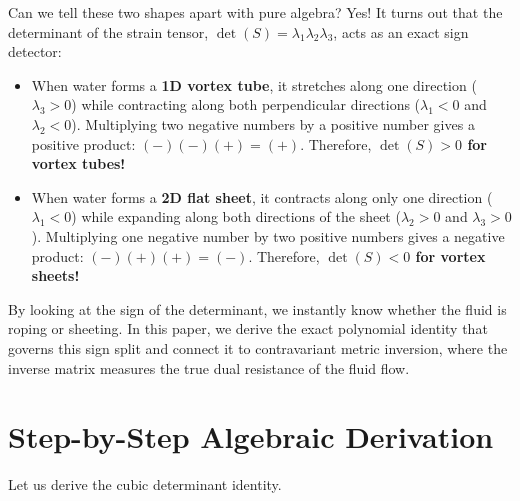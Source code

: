 \documentclass[11pt,a4paper]{article}
\theoremstyle{definition}
\begin{document}
Can we tell these two shapes apart with pure algebra? Yes! It turns out that the determinant of the strain tensor, $\det(S) = \lambda_1 \lambda_2 \lambda_3$, acts as an exact sign detector:
\begin{itemize}
    \item When water forms a \textbf{1D vortex tube}, it stretches along one direction ($\lambda_3 > 0$) while contracting along both perpendicular directions ($\lambda_1 < 0$ and $\lambda_2 < 0$). Multiplying two negative numbers by a positive number gives a positive product: $(-)(-) (+) = (+)$. Therefore, \textbf{$\det(S) > 0$ for vortex tubes!}
    \item When water forms a \textbf{2D flat sheet}, it contracts along only one direction ($\lambda_1 < 0$) while expanding along both directions of the sheet ($\lambda_2 > 0$ and $\lambda_3 > 0$). Multiplying one negative number by two positive numbers gives a negative product: $(-)(+) (+) = (-)$. Therefore, \textbf{$\det(S) < 0$ for vortex sheets!}
\end{itemize}
By looking at the sign of the determinant, we instantly know whether the fluid is roping or sheeting. In this paper, we derive the exact polynomial identity that governs this sign split and connect it to contravariant metric inversion, where the inverse matrix measures the true dual resistance of the fluid flow.


\section{Step-by-Step Algebraic Derivation}

Let us derive the cubic determinant identity.
\end{document}

